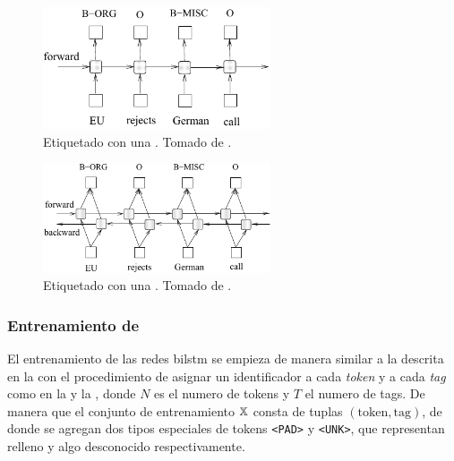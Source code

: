 \begin{figure}[H]
  \centering
  \includegraphics[width=0.6\textwidth]{Figures/lstm-arch.pdf}
\decoRule
\caption[Etiquetado con una ]{Etiquetado con una . Tomado de \cite{Huang2015}.}
\label{fig:lstm-arch}
\end{figure}

\begin{figure}[H]
  \centering
  \includegraphics[width=0.6\textwidth]{Figures/bilstm-arch.pdf}
\decoRule
\caption[Etiquetado con una ]{Etiquetado con una . Tomado de \cite{Huang2015}.}
\label{fig:bilstm-arch}
\end{figure}



\subsubsection{Entrenamiento de }
El entrenamiento de las redes \gls{bilstm} se empieza de manera similar a la descrita en la  con el procedimiento de asignar un identificador a cada \emph{token} y a cada \emph{tag} como en la  y la , donde $N$ es el numero de tokens y $T$ el numero de tags. De manera que el conjunto de entrenamiento ${\mathbb{X}}$ consta de tuplas $(\text{token}, \text{tag})$, de donde se agregan dos tipos especiales de tokens \texttt{<PAD>} y \texttt{<UNK>}, que representan relleno y algo desconocido respectivamente.

